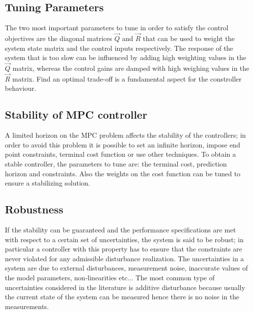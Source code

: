 \subsection{Tuning Parameters}
The two most important parameters to tune in order to satisfy the control objectives are the diagonal matrices $\vec{Q}$ and $\vec{R}$ that can be used to weight the system state matrix and the control inputs respectively. The response of the system that is too slow can be influenced by adding high weighting values in the $\vec{Q}$ matrix, whereas the control gains are damped with high weighing values in the $\vec{R}$ matrix. Find an optimal trade-off is a fundamental aspect for the constroller behaviour.

\subsection{Stability of MPC controller}
A limited horizon on the MPC problem affects the stability of the controllers; in order to avoid this problem it is possible to set an infinite horizon, impose end point constraints, terminal cost function or use other techniques. To obtain a stable controller, the parameters to tune are: the terminal cost, prediction horizon and constraints. Also the weights on the cost function can be tuned to ensure a stabilizing solution.

\subsection{Robustness}
If the stability can be guaranteed and the performance specifications are met with respect to a certain set of uncertainties, the system is said to be robust; in particular a controller with this property has to ensure that the constraints are never violated for any admissible disturbance realization. The uncertainties in a system are due to external disturbances, measurement noise, inaccurate values of the model parameters, non-linearities etc...
The most common type of uncertainties considered in the literature is additive disturbance because usually the current state of the system can be measured hence there is no noise in the measurements.

